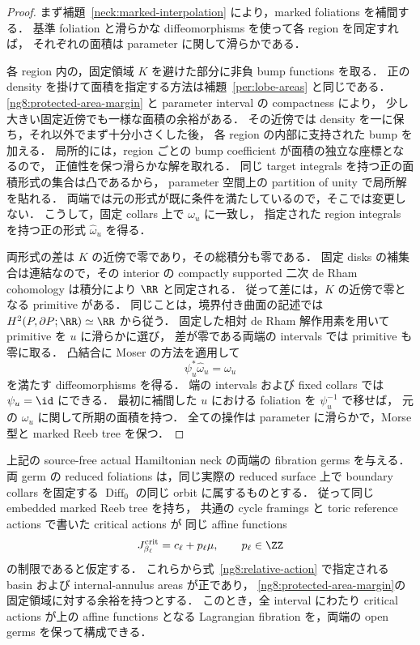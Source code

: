 \begin{proof}
まず補題~\ref{neck:marked-interpolation} により，marked foliations を補間する．
基準 foliation と滑らかな diffeomorphisms を使って各 region を同定すれば，
それぞれの面積は parameter に関して滑らかである．

各 region 内の，固定領域 $K$ を避けた部分に非負 bump functions を取る．
正の density を掛けて面積を指定する方法は補題~\ref{per:lobe-areas} と同じである．
\eqref{ng8:protected-area-margin} と parameter interval の compactness により，
少し大きい固定近傍でも一様な面積の余裕がある．
その近傍では density を一に保ち，それ以外でまず十分小さくした後，
各 region の内部に支持された bump を加える．
局所的には，region ごとの bump coefficient が面積の独立な座標となるので，
正値性を保つ滑らかな解を取れる．
同じ target integrals を持つ正の面積形式の集合は凸であるから，
parameter 空間上の partition of unity で局所解を貼れる．
両端では元の形式が既に条件を満たしているので，そこでは変更しない．
こうして，固定 collars 上で $\omega_u$ に一致し，
指定された region integrals を持つ正の形式 $\widehat\omega_u$ を得る．

両形式の差は $K$ の近傍で零であり，その総積分も零である．
固定 disks の補集合は連結なので，その interior の compactly supported
二次 de Rham cohomology は積分により $\RR$ と同定される．
従って差には，$K$ の近傍で零となる primitive がある．
同じことは，境界付き曲面の記述では $H^2(P,\partial P;\RR)\simeq\RR$ から従う．
固定した相対 de Rham 解作用素を用いて primitive を $u$ に滑らかに選び，
差が零である両端の intervals では primitive も零に取る．
凸結合に Moser の方法を適用して
\[
 \psi_u^*\widehat\omega_u=\omega_u
\]
を満たす diffeomorphisms を得る．
端の intervals および fixed collars では $\psi_u=\id$ にできる．
最初に補間した $u$ における foliation を $\psi_u^{-1}$ で移せば，
元の $\omega_u$ に関して所期の面積を持つ．
全ての操作は parameter に滑らかで，Morse 型と marked Reeb tree を保つ．
\end{proof}

\begin{proposition}
\label{ng8:straight-neck}
上記の source-free actual Hamiltonian neck の両端の fibration germs を与える．
両 germ の reduced foliations は，同じ実際の reduced surface 上で
boundary collars を固定する $\operatorname{Diff}_0$ の同じ orbit に属するものとする．
従って同じ embedded marked Reeb tree を持ち，
共通の cycle framings と toric reference actions で書いた critical actions が
同じ affine functions
\[
 J_{\beta_\ell}^{\rm crit}=c_\ell+p_\ell\mu,\qquad p_\ell\in\ZZ
\]
の制限であると仮定する．
これらから式~\eqref{ng8:relative-action} で指定される
basin および internal-annulus areas が正であり，
\eqref{ng8:protected-area-margin}の固定領域に対する余裕を持つとする．
このとき，全 interval にわたり critical actions が上の affine functions となる
Lagrangian fibration を，両端の open germs を保って構成できる．
\end{proposition}

